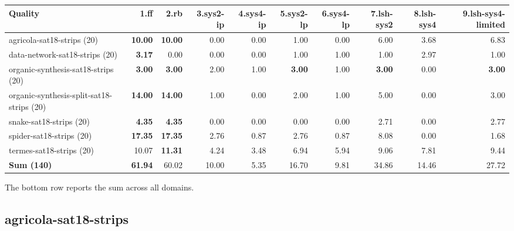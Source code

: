 \documentclass{article}
\newcommand{\numtasks}[1]{\small{(#1)}}
\begin{document}
\begin{tabular}{@{}lrrrrrrrrr@{}}
Quality & 1.ff & 2.rb & 3.sys2-ip & 4.sys4-ip & 5.sys2-lp & 6.sys4-lp & 7.lsh-sys2 & 8.lsh-sys4 & 9.lsh-sys4-limited \\
\midrule
agricola-sat18-strips \numtasks{20} & \textbf{10.00} & \textbf{10.00} & 0.00 & 0.00 & 1.00 & 0.00 & 6.00 & 3.68 & 6.83 \\
data-network-sat18-strips \numtasks{20} & \textbf{3.17} & 0.00 & 0.00 & 0.00 & 1.00 & 1.00 & 1.00 & 2.97 & 1.00 \\
organic-synthesis-sat18-strips \numtasks{20} & \textbf{3.00} & \textbf{3.00} & 2.00 & 1.00 & \textbf{3.00} & 1.00 & \textbf{3.00} & 0.00 & \textbf{3.00} \\
organic-synthesis-split-sat18-strips \numtasks{20} & \textbf{14.00} & \textbf{14.00} & 1.00 & 0.00 & 2.00 & 1.00 & 5.00 & 0.00 & 3.00 \\
snake-sat18-strips \numtasks{20} & \textbf{4.35} & \textbf{4.35} & 0.00 & 0.00 & 0.00 & 0.00 & 2.71 & 0.00 & 2.77 \\
spider-sat18-strips \numtasks{20} & \textbf{17.35} & \textbf{17.35} & 2.76 & 0.87 & 2.76 & 0.87 & 8.08 & 0.00 & 1.68 \\
termes-sat18-strips \numtasks{20} & 10.07 & \textbf{11.31} & 4.24 & 3.48 & 6.94 & 5.94 & 9.06 & 7.81 & 9.44 \\
\textbf{Sum \numtasks{140}} & \textbf{61.94} & 60.02 & 10.00 & 5.35 & 16.70 & 9.81 & 34.86 & 14.46 & 27.72 \\
\end{tabular}

The bottom row reports the sum across all domains.

\hypertarget{quality-agricola-sat18-strips}{}
\subsection*{agricola-sat18-strips}
\end{document}
